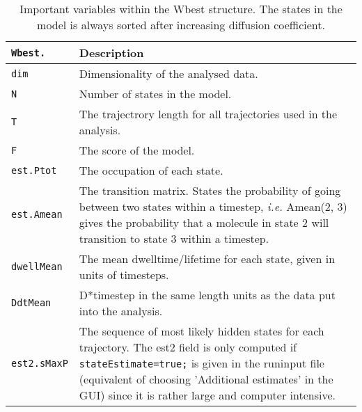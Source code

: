 \newpage

\begin{table}[ht]
\caption{Important variables within the Wbest structure. The states in the model is always sorted after increasing diffusion coefficient.} 
\centering 
\begin{tabular*}{13.1cm}{ | m{2.7cm} | m{9.5cm} | } 
\hline
\texttt{Wbest.} & \textbf{Description} \\ [0.5ex] 
\hline \hline 
\texttt{dim} 						& Dimensionality of the analysed data.\\[0.5ex]   \hline 
\texttt{N}  						& Number of states in the model.\\[0.5ex]  \hline 
\texttt{T}							& The trajectrory length for all trajectories used in the analysis.\\[0.5ex]  \hline 
\texttt{F}						 	& The score of the model.\\[0.5ex]  \hline 
\texttt{est.Ptot}				& The occupation of each state.\\[0.5ex]  \hline 
\texttt{est.Amean}			& The transition matrix. States the probability of going between two states within a timestep, \textit{i.e.} Amean(2, 3) gives the probability that a molecule in state 2 will transition to state 3 within a timestep.\\[0.5ex]  \hline 
\texttt{dwellMean}			& The mean dwelltime/lifetime for each state, given in units of timesteps.\\[0.5ex]  \hline 
\texttt{DdtMean}				& D*timestep in the same length units as the data put into the analysis.\\[0.5ex]  \hline 
\texttt{est2.sMaxP}			& The sequence of most likely hidden states for each trajectory. The est2 field is only computed if \texttt{stateEstimate=true;} is given in the runinput file (equivalent of choosing 'Additional estimates' in the GUI) since it is rather large and computer intensive. \\[1ex] %
\hline 
\end{tabular*}\label{Tab:Wbest} 
\end{table}

\newpage

